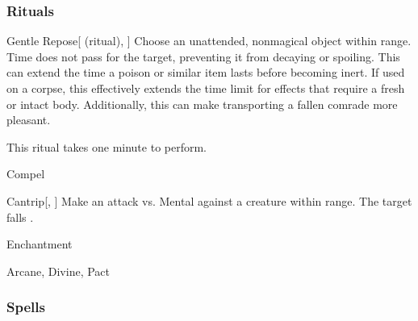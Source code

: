 \subsubsection{Rituals}


\lowercase{\hypertarget{spell:Gentle Repose}{}}\label{spell:Gentle Repose}
\begin{ability}[\nth{2}]{\hypertarget{spell:Gentle Repose}{Gentle Repose}}[ (ritual), ]
Choose an unattended, nonmagical object within \rngclose range.
Time does not pass for the target, preventing it from decaying or spoiling.
This can extend the time a poison or similar item lasts before becoming inert.
If used on a corpse, this effectively extends the time limit for effects that require a fresh or intact body.
Additionally, this can make transporting a fallen comrade more pleasant.


This ritual takes one minute to perform.
\end{ability}
\vspace{0.25em}


\newpage
\begin{spellsection}{Compel}

\begin{spellheader}
\end{spellheader}


\begin{ability}{Cantrip}[, ]
Make an attack vs. Mental against a creature within \rngmed range.
\hit The target falls .
\end{ability}




 Enchantment

 Arcane, Divine, Pact
\end{spellsection}


\subsubsection{Spells}


